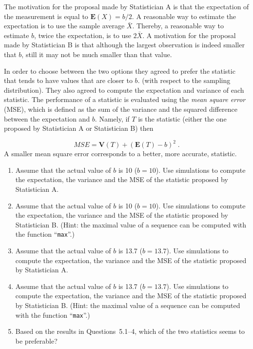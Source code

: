 \documentclass[
]{krantz}
\newcommand{\Expec}{\mathbf{E}}
\newcommand{\Var}{\mathbf{V}}
\theoremstyle{definition}
\theoremstyle{definition}
\theoremstyle{definition}
\theoremstyle{remark}
\begin{document}
The motivation for the proposal made by Statistician A is that the
expectation of the measurement is equal to \(\Expec(X) = b/2\). A
reasonable way to estimate the expectation is to use the sample average
\(\bar X\). Thereby, a reasonable way to estimate \(b\), twice the
expectation, is to use \(2 \bar X\). A motivation for the proposal made by
Statistician B is that although the largest observation is indeed
smaller that \(b\), still it may not be much smaller than that value.

In order to choose between the two options they agreed to prefer the
statistic that tends to have values that are closer to \(b\). (with
respect to the sampling distribution). They also agreed to compute the
expectation and variance of each statistic. The performance of a
statistic is evaluated using the \emph{mean square error} (MSE), which is
defined as the sum of the variance and the squared difference between
the expectation and \(b\). Namely, if \(T\) is the statistic (either the one
proposed by Statistician A or Statistician B) then

\[MSE = \Var(T) + (\Expec(T) - b)^2\;.\] A smaller mean square error
corresponds to a better, more accurate, statistic.

\begin{enumerate}
\def\labelenumi{\arabic{enumi}.}
\item
  Assume that the actual value of \(b\) is 10 (\(b=10\)). Use simulations
  to compute the expectation, the variance and the MSE of the
  statistic proposed by Statistician A.
\item
  Assume that the actual value of \(b\) is 10 (\(b=10\)). Use simulations
  to compute the expectation, the variance and the MSE of the
  statistic proposed by Statistician B. (Hint: the maximal value of a
  sequence can be computed with the function ``\texttt{max}''.)
\item
  Assume that the actual value of \(b\) is 13.7 (\(b=13.7\)). Use
  simulations to compute the expectation, the variance and the MSE of
  the statistic proposed by Statistician A.
\item
  Assume that the actual value of \(b\) is 13.7 (\(b=13.7\)). Use
  simulations to compute the expectation, the variance and the MSE of
  the statistic proposed by Statistician B. (Hint: the maximal value
  of a sequence can be computed with the function ``\texttt{max}''.)
\item
  Based on the results in Questions~5.1--4, which of the two statistics
  seems to be preferable?
\end{enumerate}
\end{document}
